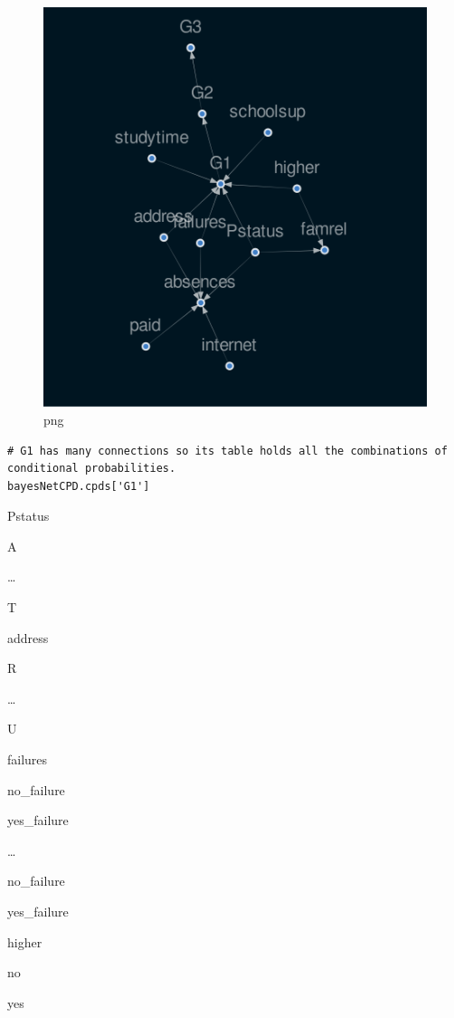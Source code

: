 \documentclass[
]{article}
\begin{document}
\begin{figure}
\centering
\includegraphics{FirstCausalNexTutorial_files/FirstCausalNexTutorial_130_0.png}
\caption{png}
\end{figure}

\begin{verbatim}
# G1 has many connections so its table holds all the combinations of conditional probabilities.
bayesNetCPD.cpds['G1']
\end{verbatim}

Pstatus

A

\ldots{}

T

address

R

\ldots{}

U

failures

no\_failure

yes\_failure

\ldots{}

no\_failure

yes\_failure

higher

no

yes
\end{document}
